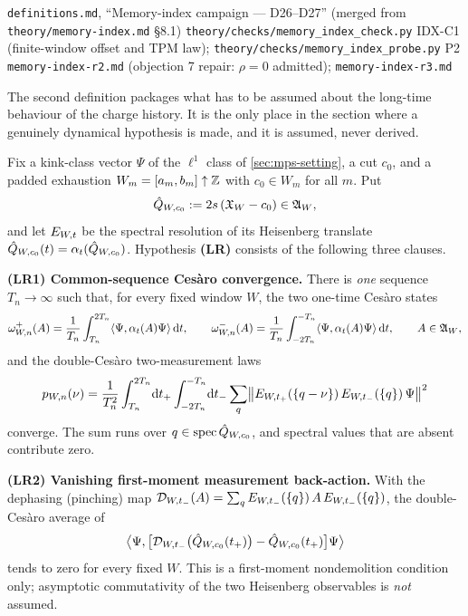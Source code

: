 {\texttt{definitions.md}, ``Memory-index campaign --- D26--D27'' (merged from
 \texttt{theory/memory-index.md} \S8.1)}
{\texttt{theory/checks/memory\_index\_check.py} IDX-C1 (finite-window offset
 and TPM law); \texttt{theory/checks/memory\_index\_probe.py} P2}
{\texttt{memory-index-r2.md} (objection 7 repair: $\rho=0$ admitted);
 \texttt{memory-index-r3.md}}

The second definition packages what has to be assumed about the long-time
behaviour of the charge history. It is the only place in the section where a
genuinely dynamical hypothesis is made, and it is assumed, never derived.

\begin{definition}
\label{def:lr}
Fix a kink-class vector $\Psi$ of the $\ell^1$ class of
\cref{sec:mps-setting}, a cut $c_0$, and a padded exhaustion
$W_m=[a_m,b_m]\uparrow\mathbb{Z}$ with $c_0\in W_m$ for all $m$. Put
\begin{equation}
  \hat{Q}_{W,c_0}:=2s\,(\mathfrak{X}_W-c_0)\in\mathfrak{A}_W ,
  \label{eq:qhat-def}
\end{equation}
and let $E_{W,t}$ be the spectral resolution of its Heisenberg
translate $\hat{Q}_{W,c_0}(t)=\alpha_t(\hat{Q}_{W,c_0})$. Hypothesis
\textbf{(LR)} consists of the following three clauses.

\medskip\noindent\textbf{(LR1) Common-sequence Cesàro convergence.} There is
\emph{one} sequence $T_n\to\infty$ such that, for every fixed window $W$, the
two one-time Cesàro states
\begin{equation}
  \omega^{+}_{W,n}(A)=\frac{1}{T_n}\int_{T_n}^{2T_n}
     \langle \Psi,\alpha_t(A)\Psi\rangle\,\mathrm{d}t,
  \qquad
  \omega^{-}_{W,n}(A)=\frac{1}{T_n}\int_{-2T_n}^{-T_n}
     \langle \Psi,\alpha_t(A)\Psi\rangle\,\mathrm{d}t,
  \qquad A\in\mathfrak{A}_W ,
  \label{eq:lr1-states}
\end{equation}
and the double-Cesàro two-measurement laws
\begin{equation}
  p_{W,n}(\nu)=\frac{1}{T_n^{2}}\int_{T_n}^{2T_n}\!\mathrm{d}t_+
   \int_{-2T_n}^{-T_n}\!\mathrm{d}t_-
   \sum_{q}\bigl\lVert E_{W,t_+}(\{q-\nu\})\,
                       E_{W,t_-}(\{q\})\,\Psi\bigr\rVert^{2}
  \label{eq:lr1-laws}
\end{equation}
converge. The sum runs over $q\in\operatorname{spec}\hat{Q}_{W,c_0}$, and spectral values
that are absent contribute zero.

\medskip\noindent\textbf{(LR2) Vanishing first-moment measurement
back-action.} With the dephasing (pinching) map
$\mathcal{D}_{W,t_-}(A)=\sum_q E_{W,t_-}(\{q\})\,A\,
E_{W,t_-}(\{q\})$, the double-Cesàro average of
\begin{equation}
  \bigl\langle\Psi,\bigl[\mathcal{D}_{W,t_-}\bigl(\hat{Q}_{W,c_0}(t_+)\bigr)
     -\hat{Q}_{W,c_0}(t_+)\bigr]\Psi\bigr\rangle
  \label{eq:lr2-defect}
\end{equation}
tends to zero for every fixed $W$. This is a first-moment nondemolition
condition only; asymptotic commutativity of the two Heisenberg observables is
\emph{not} assumed.


\end{definition}
